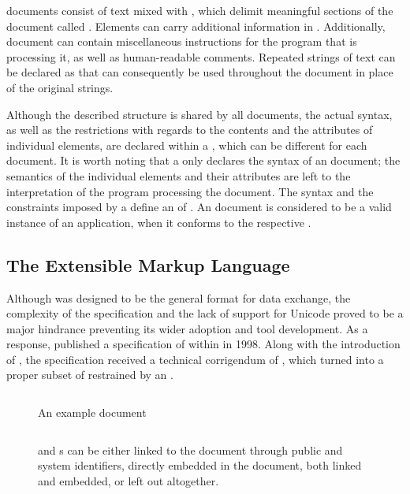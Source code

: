 \documentclass{book}
\begin{document}
 documents consist of text mixed with 
, which delimit meaningful sections of the document called
 . Elements can carry additional
information in  . Additionally,
 document can contain miscellaneous instructions for the program
that is processing it, as well as human-readable comments. Repeated strings of
text can be declared as   that can
consequently be used throughout the document in place of the original strings.

Although the described structure is shared by all  documents, the
actual syntax, as well as the restrictions with regards to the contents and the
attributes of individual elements, are declared within a , which
can be different for each document. It is worth noting that a  only
declares the syntax of an  document; the semantics of the
individual elements and their attributes are left to the interpretation of the
program processing the document. The syntax and the constraints imposed by a
 define an   of
. An  document is considered to be a valid instance
of an  application, when it conforms to the respective
.

\subsection{The Extensible Markup Language}
Although  was designed to be the general format for data exchange,
the complexity of the specification and the lack of support for Unicode proved
to be a major hindrance preventing its wider adoption and tool development. As a
response,  published a specification of  within
\cite{bray98} in 1998. Along with the introduction of , the
 specification received a technical corrigendum of
\cite{goldfarb97:webSGML}, which turned  into a proper subset of
 restrained by an  .

\begin{figure}
  \inputminted{xml}{examples/02/recipe.xml}
  \caption{An example  document}
  \label{fig:recipe}\bigskip
  \inputminted{dtd}{examples/02/dtdtypes}
  \caption{ and  s can be either linked
    to the document through public and system identifiers, directly embedded in
    the document, both linked and embedded, or left out altogether.}
  \label{fig:recipe-dtd}
\end{figure}
        
\end{document}
